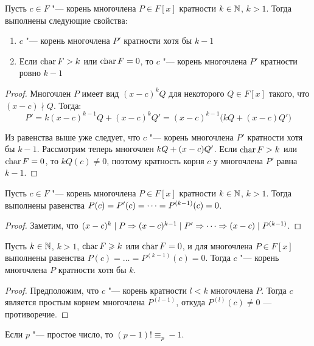 \begin{theorem}
	Пусть $c \in F$ "--- корень многочлена $P \in F[x]$ кратности $k \in \mathbb{N}$, $k > 1$. Тогда выполнены следующие свойства:
	\begin{enumerate}
		\item $c$ "--- корень многочлена $P'$ кратности хотя бы $k - 1$
		\item Если $\operatorname{char}{F} > k$ или $\operatorname{char}{F} = 0$, то $c$ "--- корень многочлена $P'$ кратности ровно $k - 1$
	\end{enumerate}
\end{theorem}

\begin{proof}
	Многочлен $P$ имеет вид $(x - c)^kQ$ для некоторого $Q \in F[x]$ такого, что $(x - c)\nmid Q$. Тогда:
	\[P' = k(x - c)^{k - 1}Q + (x - c)^kQ' = (x - c)^{k - 1}\big(kQ + (x-c)Q'\big)\]
	
	Из равенства выше уже следует, что $c$ "--- корень многочлена $P'$ кратности хотя бы $k - 1$. Рассмотрим теперь многочлен $kQ \hm{+} (x - c)Q'$. Если $\operatorname{char}{F} > k$ или $\operatorname{char}{F} = 0$, то $kQ(c) \ne 0$, поэтому кратность корня $c$ у многочлена $P'$ равна $k - 1$.
\end{proof}

\begin{corollary}
	Пусть $c \in F$ "--- корень многочлена $P \in F[x]$ кратности $k \in \mathbb{N}$, $k > 1$. Тогда выполнены равенства $P(c) = P'(c) \hm{=} \dots = P^{(k - 1)}(c) = 0$.
\end{corollary}

\begin{proof}
	Заметим, что $(x - c)^k\mid P \Rightarrow (x - c)^{k - 1}\mid P' \hm\Rightarrow \dots \Rightarrow (x - c)\mid P^{(k - 1)}$.
\end{proof}

\begin{corollary}
	Пусть $k \in \mathbb{N}$, $k > 1$, $\operatorname{char}{F} \geqslant k$ или $\operatorname{char}{F} = 0$, и для многочлена $P \in F[x]$ выполнены равенства $P(c) = \dots = P^{(k - 1)}(c) = 0$. Тогда $c$ "--- корень многочлена $P$ кратности хотя бы $k$.
\end{corollary}

\begin{proof}
	Предположим, что $c$ "--- корень кратности $l < k$ многочлена $P$. Тогда $c$ является простым корнем многочлена $P^{(l - 1)}$, откуда $P^{(l)}(c) \ne 0$ --- противоречие.
\end{proof}

\begin{corollary}
	Если $p$ "--- простое число, то $(p - 1)! \equiv_p -1$.
\end{corollary}

